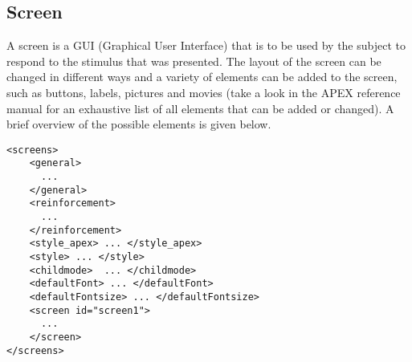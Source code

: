 \subsection{Screen}
\label{sec:screen}


\begin{description} \item A screen is a GUI (Graphical User Interface) that is to be used by the subject to
respond to the stimulus that was presented. The layout of the screen can be changed in different ways and a variety of elements can be added to the screen, such as buttons, labels, pictures and movies (take a look in the APEX reference manual for an exhaustive list of all elements that can be added or changed). A brief overview of the possible elements is given below.
\end{description}

\begin{lstlisting}
<screens>
    <general>
      ...
    </general>
    <reinforcement>
      ...
    </reinforcement>
    <style_apex> ... </style_apex>
    <style> ... </style>
    <childmode>  ... </childmode>
    <defaultFont> ... </defaultFont>
    <defaultFontsize> ... </defaultFontsize>
    <screen id="screen1">
      ...
    </screen>
</screens>
\end{lstlisting}

